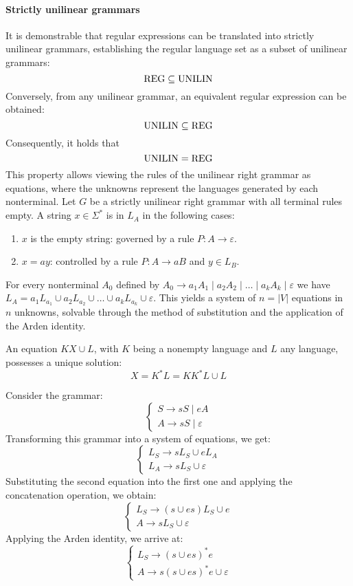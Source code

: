 \paragraph*{Strictly unilinear grammars}
It is demonstrable that regular expressions can be translated into strictly unilinear grammars, establishing the regular language set as a subset of unilinear grammars:
\[\textnormal{REG} \subseteq \textnormal{UNILIN}\]
Conversely, from any unilinear grammar, an equivalent regular expression can be obtained:
\[\textnormal{UNILIN} \subseteq \textnormal{REG}\]
Consequently, it holds that
\[\textnormal{UNILIN}=\textnormal{REG}\]
This property allows viewing the rules of the unilinear right grammar as equations, where the unknowns represent the languages generated by each nonterminal.
Let $G$ be a strictly unilinear right grammar with all terminal rules empty.
A string $x \in \Sigma^{\ast}$ is in $L_A$ in the following cases:
\begin{enumerate}
    \item $x$ is the empty string: governed by a rule $P: A \rightarrow \varepsilon$.
    \item $x=ay$: controlled by a rule $P: A \rightarrow aB$ and $y \in L_B$.
\end{enumerate}
For every nonterminal $A_0$ defined by $A_0 \rightarrow a_1A_1\mid a_2A_2\mid \dots\mid a_kA_k\mid \varepsilon$ we have $L_A=a_1L_{a_1} \cup a_2L_{a_2} \cup \dots \cup a_kL_{a_k} \cup \varepsilon$. 
This yields a system of $n=\left\lvert V \right\rvert$ equations in $n$ unknowns, solvable through the method of substitution and the application of the Arden identity.
\begin{definition}
    An equation $KX \cup L$, with $K$ being a nonempty language and $L$ any language, possesses a unique solution: 
    \[X=K^{\ast}L=KK^{\ast}L \cup L\]
\end{definition}
\begin{example}
    Consider the grammar: 
    \[\begin{cases}
        S \rightarrow sS \mid  eA \\
        A \rightarrow sS \mid  \varepsilon
    \end{cases}\]
    Transforming this grammar into a system of equations, we get:
    \[\begin{cases}
        L_S \rightarrow sL_S \cup eL_A \\
        L_A \rightarrow sL_S \cup \varepsilon
    \end{cases}\]
    Substituting the second equation into the first one and applying the concatenation operation, we obtain:
    \[\begin{cases}
        L_S \rightarrow (s \cup es)L_S \cup e \\
        A \rightarrow sL_S \cup \varepsilon
    \end{cases}\]
    Applying the Arden identity, we arrive at:
    \[\begin{cases}
        L_S \rightarrow (s \cup es)^{\ast}e \\
        A \rightarrow s(s \cup es)^{\ast}e \cup \varepsilon
    \end{cases}\]
\end{example}
